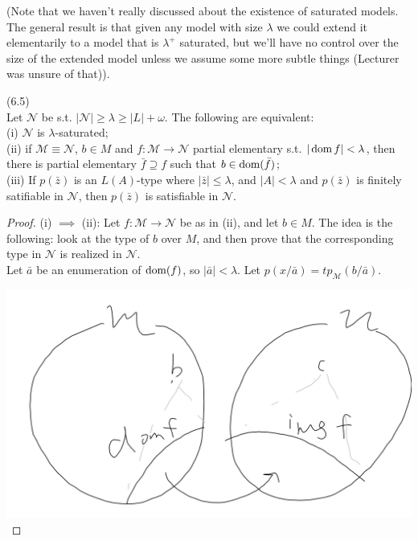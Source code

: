 \documentclass[a4paper]{article}
\begin{document}
(Note that we haven't really discussed about the existence of saturated models. The general result is that given any model with size $\lambda$ we could extend it elementarily to a model that is $\lambda^+$ saturated, but we'll have no control over the size of the extended model unless we assume some more subtle things (Lecturer was unsure of that)).

\begin{thm} (6.5)\\
    Let $\mathcal{N}$ be s.t. $|\mathcal{N}| \geq \lambda \geq |L|+\omega$. The following are equivalent:\\
    (i) $\mathcal{N}$ is $\lambda$-saturated;\\
    (ii) if $\mathcal{M} \equiv \mathcal{N}$, $b \in M$ and $f:\mathcal{M} \to \mathcal{N}$ partial elementary s.t. $|\operatorname{dom} f| < \lambda$, then there is partial elementary $\bar{f} \supseteq f$ such that $b \in \operatorname{dom}(\bar{f})$;\\
    (iii) If $p(\bar{z})$ is an $L(A)$-type where $|\bar{z}| \leq \lambda$, and $|A| < \lambda$ and $p(\bar{z})$ is finitely satifiable in $\mathcal{N}$, then $p(\bar{z})$ is satisfiable in $\mathcal{N}$.
    \begin{proof}
        (i) $\implies$ (ii): Let $f:\mathcal{M} \to \mathcal{N}$ be as in (ii), and let $b \in M$. The idea is the following: look at the type of $b$ over $M$, and then prove that the corresponding type in $\mathcal{N}$ is realized in $\mathcal{N}$.\\
        Let $\bar{a}$ be an enumeration of $\operatorname{dom}(f)$, so $|\bar{a}|<\lambda$. Let $p(x/\bar{a}) = tp_\mathcal{M} (b/\bar{a})$.

        \includegraphics[scale=0.5]{image/Model_09.png}


\end{proof}
\end{thm}
\end{document}
